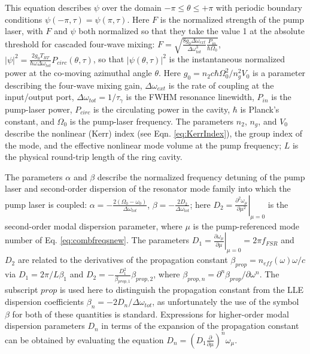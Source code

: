 This equation describes $\psi$ over the domain $-\pi\leq\theta\leq+\pi$ with periodic boundary conditions $\psi(-\pi,\tau)=\psi(\pi,\tau)$. Here $F$ is the normalized strength of the pump laser, with $F$ and $\psi$ both normalized so that they  take the value 1 at the absolute threshold for cascaded four-wave mixing: $F=\sqrt{\frac{8 g_0\Delta\omega_{ext}}{\Delta\omega_{tot}^3}\frac{P_{in}}{\hbar \Omega_0}}$, $|\psi|^2=\frac{2g_0T_{RT}}{\hbar\omega\Delta\omega_{tot}}P_{circ}(\theta,\tau)$, so that $|\psi(\theta,\tau)|^2$ is the instantaneous normalized power at the co-moving azimuthal angle $\theta$. Here $g_0=n_2 c \hbar \Omega_0^2/n_g^2 V_0$ is a parameter describing the four-wave mixing gain, $\Delta\omega_{ext}$ is the rate of coupling at the input/output port, $\Delta\omega_{tot}=1/\tau_\gamma$ is the FWHM resonance linewidth, $P_{in}$ is the pump-laser power, $P_{circ}$ is the circulating power in the cavity, $\hbar$ is Planck's constant, and $\Omega_0$ is the pump-laser frequency. The parameters $n_2$, $n_g$, and $V_0$ describe the nonlinear (Kerr) index (see Eqn. \ref{eq:KerrIndex}), the group index of the mode, and the effective nonlinear mode volume at the pump frequency; $L$ is the physical round-trip length of the ring cavity. 

The parameters $\alpha$ and $\beta$ describe the normalized frequency detuning of the pump laser and second-order dispersion of the resonator mode family into which the pump laser is coupled: $\alpha=-\frac{2(\Omega_0-\omega_0)}{\Delta\omega_{tot}}$, $\beta=-\frac{2 D_2}{\Delta\omega_{tot}}$; here $D_2=\left.\frac{\partial^2\omega_\mu}{\partial \mu^2}\right|_{\mu=0}$ is the second-order modal dispersion parameter, where $\mu$ is the pump-referenced mode number of Eq. \ref{eq:combfreqsnew}. The parameters $D_1=\left.\frac{\partial\omega_\mu}{\partial\mu}\right|_{\mu=0}=2\pi f_{FSR}$ and $D_2$ are related to the derivatives of the propagation constant $\beta_{prop}=n_{eff}(\omega)\omega/c$ via $D_1=2\pi/L\beta_1$ and $D_2=-\frac{D_1^2}{\beta_{prop,1}}\beta_{prop,2}$, where $\beta_{prop,n}=\partial^n\beta_{prop}/\partial\omega^n$. The subscript $prop$ is used here to distinguish the propagation constant from the LLE dispersion coefficients $\beta_n=-2D_n/\Delta\omega_{tot}$, as unfortunately the use of the symbol $\beta$ for both of these quantities is standard. Expressions for higher-order modal dispersion parameters $D_n$ in terms of the expansion of the propagation constant can be obtained by evaluating the equation $D_n=(D_1\frac{\partial}{\partial \mu})^n \omega_\mu$.

